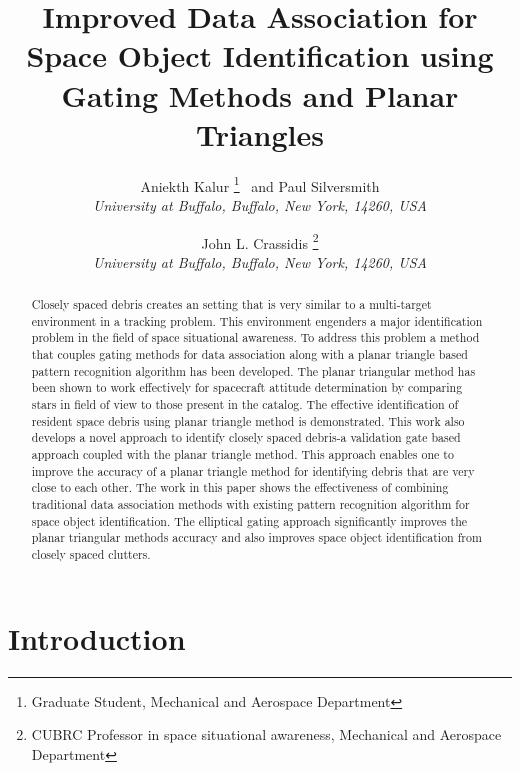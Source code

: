 \documentclass[]{aiaa-tc}%
\title{Improved Data Association for Space Object Identification using Gating Methods and Planar Triangles}
\author{
  Aniekth Kalur%
    \thanks{Graduate Student, Mechanical and Aerospace Department}
  \ and Paul Silversmith\thanksibid{1}\\
  {\normalsize\itshape
   University at Buffalo, Buffalo, New York, 14260, USA}\\
  \and
  John L. Crassidis%
   \thanks{CUBRC Professor in space situational awareness, Mechanical and Aerospace Department}\\
  {\normalsize\itshape
  University at Buffalo, Buffalo, New York, 14260, USA}
 }
\begin{document}
\maketitle

\begin{abstract}
Closely spaced debris creates an setting that is very similar to a multi-target environment in a tracking problem. This environment engenders a major identification problem in the field of space situational awareness. To address this problem a method that couples gating methods for data association along with a planar triangle based pattern recognition algorithm has been developed. The planar triangular method has been shown to work effectively for spacecraft attitude determination by comparing stars in field of view to those present in the catalog. The effective identification of resident space debris using planar triangle method is demonstrated. This work also develops a novel approach to identify closely spaced debris-a validation gate based approach  coupled with the planar triangle method. This approach enables one to improve the accuracy of a planar triangle method for identifying debris that are very close to each other. The work in this paper shows the effectiveness of combining traditional data association methods with existing pattern recognition algorithm for space object identification. The elliptical gating approach significantly improves the planar triangular methods accuracy and also improves space object identification from closely spaced clutters.
\end{abstract}


\section{Introduction}
\end{document}
